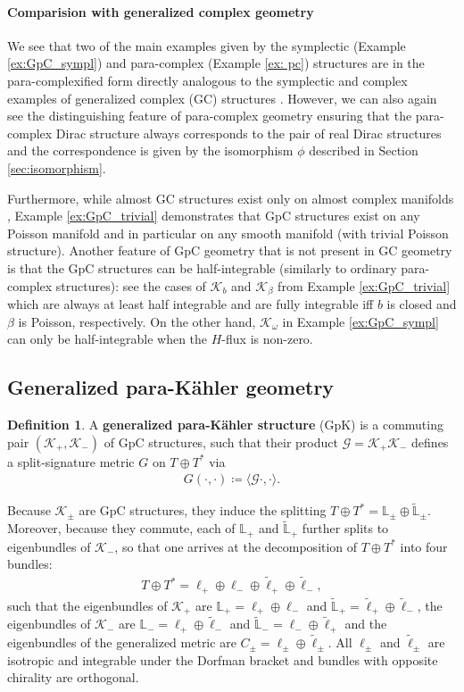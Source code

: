 \documentclass[letterpaper,12pt]{article}
\newcommand{\TT}{{T\oplus T^*}}
\newcommand{\KK}{\mathcal{K}}
\newcommand{\GG}{\mathcal{G}}
\newcommand{\Lb}{\mathbb{L}}
\newcommand{\ellt}{{\tl{\ell}}}
\newcommand{\la}{\langle}
\newcommand{\ra}{\rangle}
\def\tl{\tilde}
\theoremstyle{definition}
\newtheorem{Def}[theorem]{Definition}
\theoremstyle{remark}
\theoremstyle{examples}
\begin{document}
\paragraph{Comparision with generalized complex geometry}
We see that two of the main examples given by the symplectic (Example \ref{ex:GpC_sympl}) and para-complex (Example \ref{ex: pc}) structures are in the para-complexified form directly analogous to the symplectic and complex examples of generalized complex (GC) structures \cite{Gualtieri:2003dx}. However, we can also again see the distinguishing feature of para-complex geometry ensuring that the para-complex Dirac structure always corresponds to the pair of real Dirac structures and the correspondence is given by the isomorphism $\phi$ described in Section \ref{sec:isomorphism}.


Furthermore, while almost GC structures exist only on almost complex manifolds \cite{Gualtieri:2003dx}, Example \ref{ex:GpC_trivial} demonstrates that GpC structures exist on any Poisson manifold and in particular on any smooth manifold (with trivial Poisson structure). Another feature of GpC geometry that is not present in GC geometry is that the GpC structures can be half-integrable (similarly to ordinary para-complex structures): see the cases of $\KK_b$ and $\KK_\beta$ from Example \ref{ex:GpC_trivial} which are always at least half integrable and are fully integrable iff $b$ is closed and $\beta$ is Poisson, respectively. On the other hand, $\KK_\omega$ in Example \ref{ex:GpC_sympl} can only be half-integrable when the $H$-flux is non-zero.




\subsection{Generalized para-K\"ahler geometry}\label{sec:GpK}
\begin{Def}
A \textbf{generalized para-K\"ahler structure} (GpK) is a commuting pair $(\KK_+,\KK_-)$ of GpC structures, such that their product $\GG=\KK_+\KK_-$ defines a split-signature metric $G$ on $\TT$ via
\begin{align*}
G(\cdot,\cdot)\coloneqq \la \GG\cdot,\cdot\ra.
\end{align*}
\end{Def}

Because $\KK_\pm$ are GpC structures, they induce the splitting $\TT= \Lb_\pm\oplus\widetilde{\Lb}_\pm$. Moreover, because they commute, each of $\Lb_+$ and $\widetilde{\Lb}_+$ further splits to eigenbundles of $\KK_-$, so that one arrives at the decomposition of $\TT$ into four bundles:
\begin{align}\label{GpK_bundles}
\TT=\ell_+\oplus\ell_-\oplus \ellt_+\oplus \ellt_-,
\end{align}
such that the eigenbundles of $\KK_+$ are $\Lb_+=\ell_+\oplus\ell_-$ and $\tl{\Lb}_+=\ellt_+\oplus \ellt_-$, the eigenbundles of $\KK_-$ are $\Lb_-=\ell_+\oplus\ellt_-$ and $\tl{\Lb}_-=\ell_-\oplus \ellt_+$ and the eigenbundles of the generalized metric are $C_\pm=\ell_\pm\oplus\ellt_\pm$. All $\ell_\pm$ and $\ellt_\pm$ are isotropic and integrable under the Dorfman bracket \cite{Hu:2019zro} and bundles with opposite chirality are orthogonal.
\end{document}
